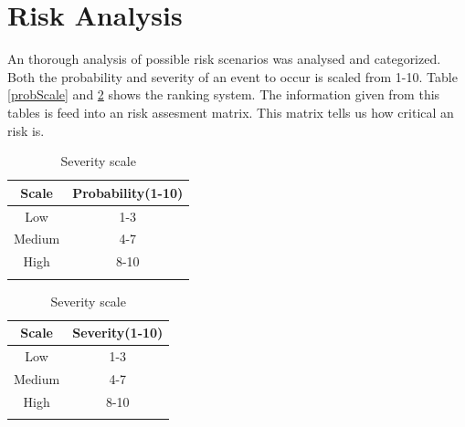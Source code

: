 
\section{Risk Analysis}
An thorough analysis of possible risk scenarios was analysed and categorized. Both the probability and severity  of an event to occur is scaled from 1-10. Table \ref{probScale} and \ref{sevScale} shows the ranking system. The information given from this tables is feed into an risk assesment matrix. This matrix tells us how critical an risk is.

\begin {table}[h]
    \begin{minipage}{.5\linewidth}
        \begin{center}
        \caption {Probability scale} 
        \label{probScale} 
            \begin{tabular}{|c|c|}\hline 
            \rowcolor{cadetgrey}
            \textbf{Scale}   & \textbf{Probability(1-10)} \\ \hline 
            Low    &   1-3              \\ \rowcolor{gainsboro}
            Medium    &   4-7           \\
            High    &   8-10            \\ \rowcolor{gainsboro}
            \hline
            \end{tabular}
        \end{center}
    \end{minipage}
    \begin{minipage}{.5\linewidth}
        \begin{center}
        \caption {Severity scale} 
        \label{sevScale} 
            \begin{tabular}{|c|c|}\hline 
            \rowcolor{cadetgrey}
            \textbf{Scale}   & \textbf{Severity(1-10)} \\ \hline 
            Low   &   1-3               \\ \rowcolor{gainsboro}
            Medium    &   4-7           \\
            High    &   8-10            \\ \rowcolor{gainsboro}
            \hline
            \end{tabular}
        \end{center}
    \end{minipage}
\end{table}
\newpage
